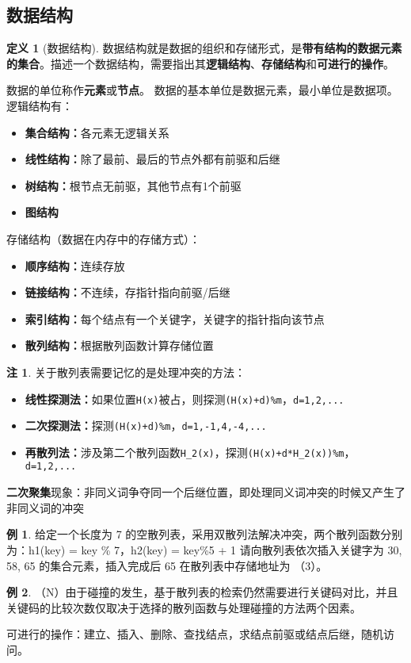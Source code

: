\documentclass[hyperref,a4paper,UTF8,12pt]{ctexart}
\theoremstyle{definition}
\newtheorem{definition}[theorem]{定义}
\newtheorem{example}{例}[section]
\newtheorem*{remark}{注}
\begin{document}
\subsection{数据结构}
\begin{definition}[数据结构]
    数据结构就是数据的组织和存储形式，是\textbf{带有结构的数据元素的集合}。描述一个数据结构，需要指出其\textbf{逻辑结构}、\textbf{存储结构}和\textbf{可进行的操作}。
\end{definition}
数据的单位称作\textbf{元素}或\textbf{节点}。
数据的基本单位是数据元素，最小单位是数据项。
逻辑结构有：
\begin{itemize}
    \item \textbf{集合结构：}各元素无逻辑关系
    \item \textbf{线性结构：}除了最前、最后的节点外都有前驱和后继
    \item \textbf{树结构：}根节点无前驱，其他节点有1个前驱
    \item \textbf{图结构}
\end{itemize}
存储结构（数据在内存中的存储方式）：
\begin{itemize}
    \item \textbf{顺序结构：}连续存放
    \item \textbf{链接结构：}不连续，存指针指向前驱/后继
    \item \textbf{索引结构：}每个结点有一个关键字，关键字的指针指向该节点
    \item \textbf{散列结构：}根据散列函数计算存储位置
\end{itemize}
\begin{remark}
    关于散列表需要记忆的是处理冲突的方法：
    \begin{itemize}
        \item \textbf{线性探测法：}如果位置\verb|H(x)|被占，则探测\verb|(H(x)+d)%m|，\verb|d=1,2,...|
        \item \textbf{二次探测法：}探测\verb|(H(x)+d)%m|，\verb|d=1,-1,4,-4,...|
        \item \textbf{再散列法：}涉及第二个散列函数\verb|H_2(x)|，探测\verb|(H(x)+d*H_2(x))%m|，\verb|d=1,2,...|
    \end{itemize}
    \textbf{二次聚集}现象：非同义词争夺同一个后继位置，即处理同义词冲突的时候又产生了非同义词的冲突
\end{remark}
\begin{example}
    给定一个长度为 7 的空散列表，采用双散列法解决冲突，两个散列函数分别为：h1(key) = key \% 7，h2(key) = key\%5 + 1 请向散列表依次插入关键字为 30, 58, 65 的集合元素，插入完成后 65 在散列表中存储地址为 （3）。
\end{example}
\begin{example}
    （N）由于碰撞的发生，基于散列表的检索仍然需要进行关键码对比，并且关键码的比较次数仅取决于选择的散列函数与处理碰撞的方法两个因素。
\end{example}
可进行的操作：建立、插入、删除、查找结点，求结点前驱或结点后继，随机访问。
\end{document}

